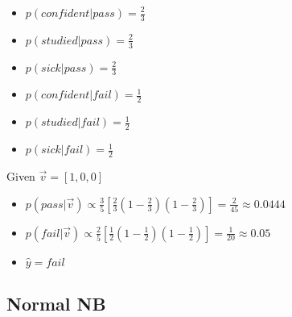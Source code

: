 \documentclass[xcolor=table]{beamer}
\begin{document}
\begin{frame}
	\begin{minipage}{0.12\textwidth}\small
		\hfill
	\end{minipage}
	\begin{minipage}{0.43\textwidth}\small
		\begin{itemize}
			\item $p(confident|pass) = \frac{2}{3}$
			\item $p(studied|pass) = \frac{2}{3}$
			\item $p(sick|pass) = \frac{2}{3}$
		\end{itemize}
	\end{minipage}
	\begin{minipage}{0.43\textwidth}\small
		\begin{itemize}
			\item $p(confident|fail) = \frac{1}{2}$
			\item $p(studied|fail) = \frac{1}{2}$
			\item $p(sick|fail) = \frac{1}{2}$
		\end{itemize}
	\end{minipage}

	\vfill
	Given $ \vec{v} = [1, 0, 0]$
	\begin{itemize}
		\item $p(pass|\vec{v}) \propto \frac{3}{5} [\frac{2}{3} (1-\frac{2}{3}) (1-\frac{2}{3})]  = \frac{2}{45} \approx 0.0444$
		\item $p(fail|\vec{v}) \propto \frac{2}{5} [\frac{1}{2} (1-\frac{1}{2}) (1-\frac{1}{2})]  = \frac{1}{20} \approx 0.05$
		\item $ \hat{y} = fail $
	\end{itemize}
	
	
\end{frame}


\subsection{Normal NB}
\end{document}
